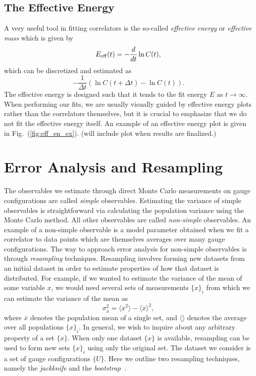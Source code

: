 \subsection{The Effective Energy}\label{sec:eff_mass}
A very useful tool in fitting correlators is the so-called \emph{effective energy} or \emph{effective mass} which is given by
\begin{equation}
    E_{\rm{eff}}(t) = -\frac{d}{dt}\ln C(t),
\end{equation}
which can be discretized and estimated as
\begin{equation}
    -\frac{1}{\Delta t}\left(\ln C(t+\Delta t)-\ln C(t)\right).
\end{equation}
The effective energy is designed such that it tends to the fit energy $E$ as $t\rightarrow \infty$. When performing our fits, we are usually visually guided by effective energy plots rather than the correlators themselves, but it is crucial to emphasize that we do not fit the effective energy itself. An example of an effective energy plot is given in Fig.~(\ref{fig:eff_en_ex}). (will include plot when results are finalized.)
\section{Error Analysis and Resampling}
The observables we estimate through direct Monte Carlo measurements on gauge configurations are called \emph{simple} observables. Estimating the variance of simple observables is straightforward via calculating the population variance using the Monte Carlo method. All other observables are called \emph{non-simple} observables. An example of a non-simple observable is a model parameter obtained when we fit a correlator to data points which are themselves averages over many gauge configurations. The way to approach error analysis for non-simple observables is through \emph{resampling} techniques. Resampling involves forming new datasets from an initial dataset in order to estimate properties of how that dataset is distributed. For example, if we wanted to estimate the variance of the mean of some variable $x$, we would need several sets of measurements $\{x\}_i$ from which we can estimate the variance of the mean as
\begin{equation}
    \sigma^2_{\overline x} = \langle  \overline x^2 \rangle  - \langle \overline x \rangle ^2,
\end{equation}
where $\overline x$ denotes the population mean of a single set, and $\langle\rangle$ denotes the average over all populations $\{x\}_i$. In general, we wish to inquire about any arbitrary property of a set $\{x\}$. When only one dataset $\{x\}$ is available, resampling can be used to form new sets $\{x\}_i$ using only the original set. The dataset we consider is a set of gauge configurations $\{U\}$. Here we outline two resampling techniques, namely the \emph{jackknife} and the \emph{bootstrap}~\cite{efron1982jackknife}.

